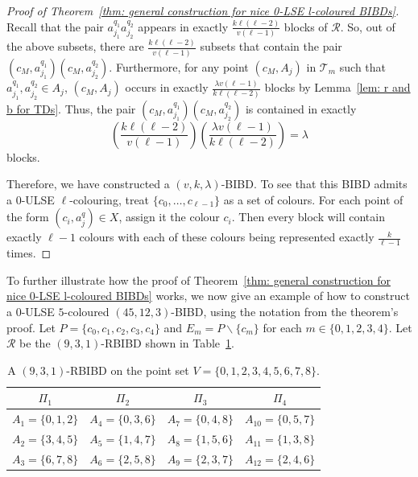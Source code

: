 \documentclass[12pt]{article}
\theoremstyle{definition}
\begin{document}
\begin{proof}[Proof of Theorem~\ref{thm: general construction for nice 0-LSE l-coloured BIBDs}]
    Recall that the pair $a_{j_1}^{q_1} a_{j_2}^{q_2}$ appears in exactly $\frac{k\ell(\ell-2)}{v(\ell-1)}$ blocks of $\mathcal{R}$. So, out of the above subsets, there are $\frac{k\ell(\ell-2)}{v(\ell-1)}$ subsets that contain the pair $(c_M, a_{j_1}^{q_1}) (c_M, a_{j_2}^{q_2})$. Furthermore, for any point $(c_M, A_j)$ in $\mathcal{T}_m$ such that $a_{j_1}^{q_1}, a_{j_2}^{q_2}\in A_j$, $(c_M, A_j)$ occurs in exactly $\frac{\lambda v (\ell-1)}{k\ell(\ell-2)}$ blocks by Lemma~\ref{lem: r and b for TDs}. Thus, the pair $(c_{M},a_{j_1}^{q_1}) (c_{M},a_{j_2}^{q_2})$ is contained in exactly \[\left(\frac{k\ell(\ell-2)}{v(\ell-1)}\right)\left( \frac{\lambda v (\ell-1)}{k\ell(\ell-2)} \right) = \lambda\] blocks. 

    Therefore, we have constructed a $(v,k,\lambda)$-BIBD. To see that this BIBD admits a $0$-ULSE $\ell$-colouring, treat $\{c_0, \dots, c_{\ell-1}\}$ as a set of colours. For each point of the form $(c_i,a_j^q) \in X$, assign it the colour $c_i$. Then every block will contain exactly $\ell-1$ colours with each of these colours being represented exactly $\frac{k}{\ell-1}$ times. 
\end{proof}

To further illustrate how the proof of Theorem~\ref{thm: general construction for nice 0-LSE l-coloured BIBDs} works, we now give an example of how to construct a $0$-ULSE $5$-coloured $(45,12,3)$-BIBD, using the notation from the theorem's proof. Let $P = \{c_0, c_1, c_2, c_3, c_4\}$ and $E_m = P\backslash \{c_m\}$ for each $m\in \{0,1,2,3,4\}$. Let $\mathcal{R}$ be the $(9,3,1)$-RBIBD shown in Table~\ref{tab: (9,3,1)-RBIBD}.

\begin{table}[ht]
    \centering
        \begin{tabular}{c|c|c|c}
            $\Pi_1$ & $\Pi_2$ & $\Pi_3$ & $\Pi_4$ \\
            \hline
            $A_1 = \{0,1,2\}$ & $A_4 = \{0,3,6\}$ & $A_7 = \{0,4,8\}$ & $A_{10} = \{0,5,7\}$\\
            $A_2 = \{3,4,5\}$ & $A_5 = \{1,4,7\}$ & $A_8 = \{1,5,6\}$ & $A_{11} = \{1,3,8\}$\\
            $A_3 = \{6,7,8\}$ & $A_6 = \{2,5,8\}$ & $A_9 = \{2,3,7\}$ & $A_{12} = \{2,4,6\}$
        \end{tabular}
    \caption{A $(9,3,1)$-RBIBD on the point set $V = \{0,1,2,3,4,5,6,7,8\}$.}
    \label{tab: (9,3,1)-RBIBD}
\end{table}
\end{document}
